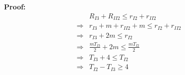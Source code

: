 \documentclass{article}
\begin{document}
\begin{multicols}{2}
  \textbf{Proof:}
  \begin{align*}
    & R_{I3} + R_{II2} \leq r_{I2} + r_{II2}\\
    \Rightarrow& r_{I3} + m + r_{II2} + m \leq r_{I2} + r_{II2}\\
    \Rightarrow& r_{I3} + 2m \leq r_{I2}\\
    \Rightarrow& \frac{mT_{I3}}{2} + 2m \leq \frac{mT_{I2}}{2}\\
    \Rightarrow& T_{I3} + 4 \leq T_{I2}\\
    \Rightarrow& T_{I2} - T_{I3} \geq 4\\
  \end{align*}
\end{multicols}

\hrulefill
\end{document}
